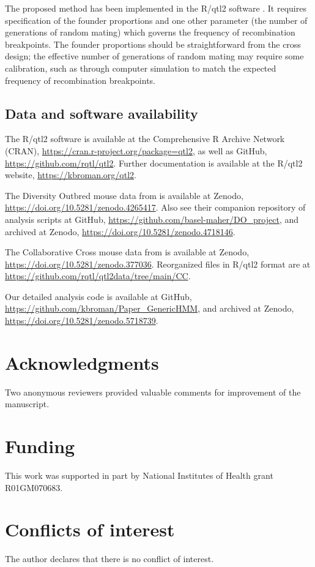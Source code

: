 \documentclass[12pt,letterpaper]{article}\usepackage[]{graphicx}\usepackage[table]{xcolor}
\begin{document}
The proposed method has been implemented in the R/qtl2 software
\citep{rqtl2}. It requires specification of the founder proportions
and one other parameter (the number of generations of random mating)
which governs the frequency of recombination breakpoints. The founder
proportions should be straightforward from the cross design; the
effective number of generations of random mating may require some
calibration, such as through computer simulation to match the expected
frequency of recombination breakpoints.



\clearpage
\subsection*{Data and software availability}

The R/qtl2 software is available at the Comprehensive R Archive
Network (CRAN), \url{https://cran.r-project.org/package=qtl2}, as well
as GitHub, \url{https://github.com/rqtl/qtl2}. Further documentation
is available at the R/qtl2 website, \url{https://kbroman.org/qtl2}.

The Diversity Outbred mouse data from \citet{albarghouthi2021} is
available at Zenodo, \url{https://doi.org/10.5281/zenodo.4265417}.
Also see their companion repository of analysis scripts at GitHub,
\url{https://github.com/basel-maher/DO_project},
and archived at Zenodo, \url{https://doi.org/10.5281/zenodo.4718146}.

The Collaborative Cross mouse data from \citet{srivastava2017} is
available at Zenodo, \url{https://doi.org/10.5281/zenodo.377036}.
Reorganized files in R/qtl2 format are at
\url{https://github.com/rqtl/qtl2data/tree/main/CC}.

Our detailed analysis code is available at GitHub,
\url{https://github.com/kbroman/Paper_GenericHMM},
and archived at Zenodo, \url{https://doi.org/10.5281/zenodo.5718739}.


\section*{Acknowledgments}

Two anonymous reviewers provided valuable comments for improvement of
the manuscript.



\section*{Funding}

This work was supported in part by
National Institutes of Health grant R01GM070683.



\section*{Conflicts of interest}

The author declares that there is no conflict of interest.




\clearpage

\renewcommand*{\refname}{\normalfont\sffamily\bfseries Literature Cited}

\end{document}
